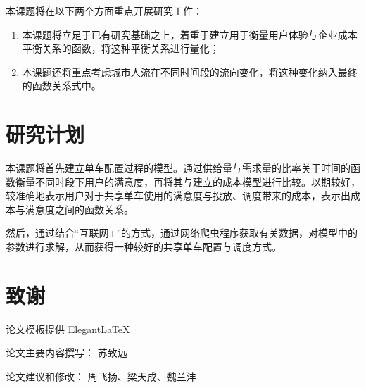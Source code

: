 \documentclass [16pt,cn,a4paper,bibtex]{elegantpaper}
\begin{document}
本课题将在以下两个方面重点开展研究工作：

\begin{enumerate}

    \item {本课题将立足于已有研究基础之上，着重于建立用于衡量用户体验与企业成本平衡关系的函数，将这种平衡关系进行量化；}
    \item{本课题还将重点考虑城市人流在不同时间段的流向变化，将这种变化纳入最终的函数关系式中。}

\end{enumerate}

\section{研究计划}

本课题将首先建立单车配置过程的模型。通过供给量与需求量的比率关于时间的函数衡量不同时段下用户的满意度，再将其与建立的成本模型进行比较。以期较好，较准确地表示用户对于共享单车使用的满意度与投放、调度带来的成本，表示出成本与满意度之间的函数关系。

然后，通过结合“互联网+”的方式，通过网络爬虫程序获取有关数据，对模型中的参数进行求解，从而获得一种较好的共享单车配置与调度方式。





\section*{致谢}

论文模板提供 Elegant\LaTeX{}

论文主要内容撰写： 苏致远

论文建议和修改： 周飞扬、梁天成、魏兰沣
\end{document}
